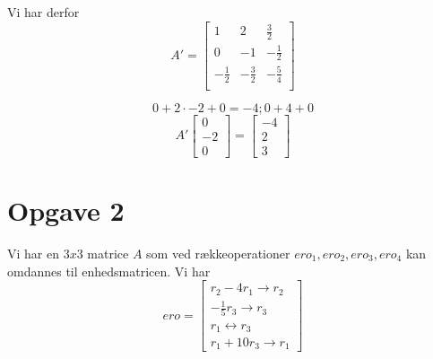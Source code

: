 \documentclass[a4paper,fleqn]{article}
\begin{document}
	
	Vi har derfor \[A' = \begin{bmatrix}
		1	&	2	&	\frac{3}{2}\\
		0	&	-1	&	-\frac{1}{2}\\
		-\frac{1}{2}&	-\frac{3}{2}	& -\frac{5}{4}\\
	\end{bmatrix}\]

	\[ 0 + 2\cdot -2 + 0 = -4 ; 0 + 4 + 0\]
	\[A'\begin{bmatrix}0\\-2\\0\end{bmatrix} = \begin{bmatrix}-4\\2\\3\end{bmatrix}\]

	\section{Opgave 2}
	Vi har en $3 x 3$ matrice $A$ som ved rækkeoperationer $ero_1, ero_2, ero_3, ero_4$ kan
	omdannes til enhedsmatricen. Vi har
	\[ ero = \begin{bmatrix}
			r_2 -4r_1 \rightarrow r_2\\
			-\frac{1}{5}r_3 \rightarrow r_3\\
			r_1 \leftrightarrow r_3\\
			r_1 + 10r_3  \rightarrow r_1
	\end{bmatrix}\]
\end{document}
